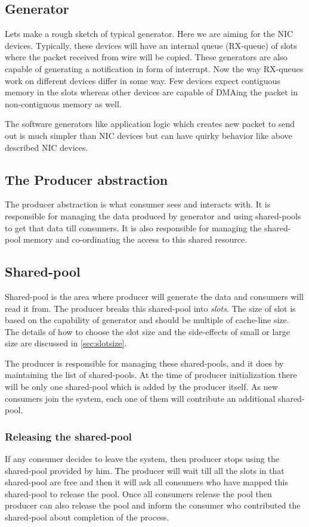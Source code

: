 \documentclass[a4paper,twoside]{report} %
\begin{document}
\subsection{Generator}
Lets make a rough sketch of typical generator.  Here we are aiming
for the NIC devices.  Typically, these devices will have an
internal queue (RX-queue) of slots where the packet received
from wire will be copied.  These generators are also capable
of generating a notification in form of interrupt.  Now the
way RX-queues work on different devices differ in some way.
Few devices expect contiguous memory in the slots whereas
other devices are capable of DMAing the packet in non-contiguous
memory as well.

	
The software generators like application
logic which creates new packet to send out is much simpler than
NIC devices but can have quirky behavior like above described
NIC devices.


\subsection{The Producer abstraction}
The producer abstraction is what consumer sees and interacts with.
It is responsible for managing the data produced by generator and
using shared-pools to get that data till consumers.  It is also
responsible for managing the shared-pool memory and co-ordinating 
the access to this shared resource.


\subsection{Shared-pool}
Shared-pool is the area where producer will generate the data
and consumers will read it from. The producer breaks this
shared-pool into \textit{slots}.  The size of slot
is based on the capability of generator and should be multiple of
cache-line size.  The details of how to choose
the slot size and the side-effects of small or large size are
discussed in \autoref{sec:slotsize}.


The producer is responsible for managing these shared-pools, and it
does by maintaining the list of shared-pools.  At the time of producer
initialization there will be only one shared-pool which is added by
the producer itself.  As new consumers join the system, each one of 
them will contribute an additional shared-pool.


\subsubsection{Releasing the shared-pool}
If any consumer decides to leave the system, then producer
stops using the shared-pool provided by him.  The producer will 
wait till all the slots in that shared-pool are free and then it will
ask all consumers who have mapped this shared-pool to release the
pool.  Once all consumers release the pool then producer can also
release the pool and inform the consumer who contributed the
shared-pool about completion of the process.
\end{document}
